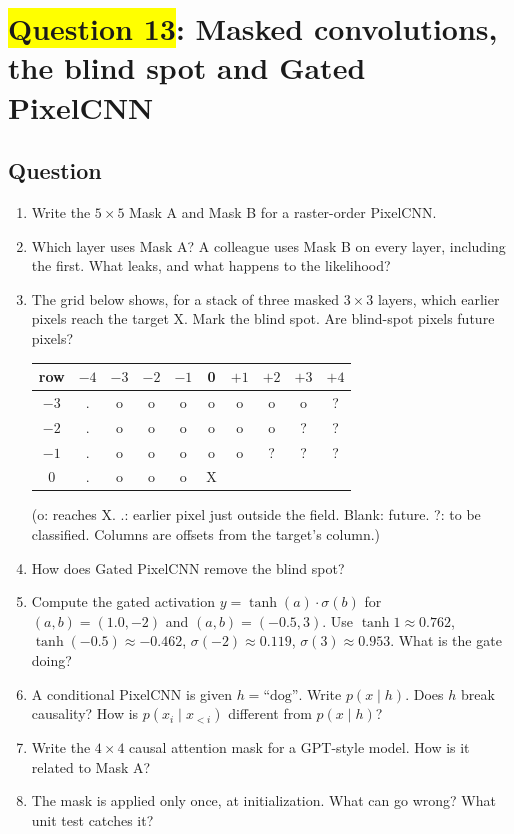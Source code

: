 \documentclass[12pt,a4paper]{article}
\begin{document}
\section{\texorpdfstring{\colorbox{yellow}{Question 13}}{Question 13}: Masked convolutions, the blind spot and Gated PixelCNN}

\subsection{Question}

\begin{enumerate}[label=(\alph*)]
  \item Write the $5\times5$ Mask A and Mask B for a raster-order PixelCNN.
  \item[\colorbox{yellow}{(b)}] Which layer uses Mask A? A colleague uses Mask B on every layer, including the first. What leaks, and what happens to the likelihood?
  \item[\colorbox{yellow}{(c)}] The grid below shows, for a stack of three masked $3\times3$ layers, which earlier pixels reach the target X. Mark the blind spot. Are blind-spot pixels future pixels?
  \begin{center}
  \begin{tabular}{@{}c|ccccccccc@{}}
  row & $-4$ & $-3$ & $-2$ & $-1$ & 0 & $+1$ & $+2$ & $+3$ & $+4$ \\
  \midrule
  $-3$ & . & o & o & o & o & o & o & o & ? \\
  $-2$ & . & o & o & o & o & o & o & ? & ? \\
  $-1$ & . & o & o & o & o & o & ? & ? & ? \\
  $0$ & . & o & o & o & X & & & & \\
  \end{tabular}
  \end{center}
  (o: reaches X. .: earlier pixel just outside the field. Blank: future. ?: to be classified. Columns are offsets from the target's column.)
  \item[\colorbox{yellow}{(d)}] How does Gated PixelCNN remove the blind spot?
  \item[\colorbox{yellow}{(e)}] Compute the gated activation $y=\tanh(a)\cdot\sigma(b)$ for $(a,b)=(1.0,-2)$ and $(a,b)=(-0.5,3)$. Use $\tanh1\approx0.762$, $\tanh(-0.5)\approx-0.462$, $\sigma(-2)\approx0.119$, $\sigma(3)\approx0.953$. What is the gate doing?
  \item[\colorbox{yellow}{(f)}] A conditional PixelCNN is given $h=\text{``dog''}$. Write $p(x\mid h)$. Does $h$ break causality? How is $p(x_i\mid x_{<i})$ different from $p(x\mid h)$?
  \item[\colorbox{yellow}{(g)}] Write the $4\times4$ causal attention mask for a GPT-style model. How is it related to Mask A?
  \item[\colorbox{yellow}{(h)}] The mask is applied only once, at initialization. What can go wrong? What unit test catches it?
\end{enumerate}
\end{document}
